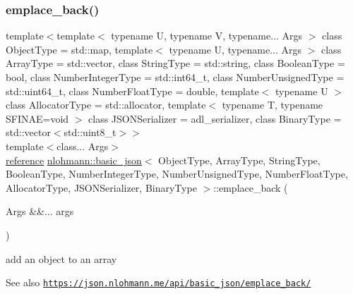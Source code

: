 \subsubsection{\texorpdfstring{emplace\+\_\+back()}{emplace\_back()}}
{\footnotesize\ttfamily template$<$template$<$ typename U, typename V, typename... Args $>$ class Object\+Type = std\+::map, template$<$ typename U, typename... Args $>$ class Array\+Type = std\+::vector, class String\+Type  = std\+::string, class Boolean\+Type  = bool, class Number\+Integer\+Type  = std\+::int64\+\_\+t, class Number\+Unsigned\+Type  = std\+::uint64\+\_\+t, class Number\+Float\+Type  = double, template$<$ typename U $>$ class Allocator\+Type = std\+::allocator, template$<$ typename T, typename S\+F\+I\+N\+A\+E=void $>$ class J\+S\+O\+N\+Serializer = adl\+\_\+serializer, class Binary\+Type  = std\+::vector$<$std\+::uint8\+\_\+t$>$$>$ \\
template$<$class... Args$>$ \\
\hyperlink{classnlohmann_1_1basic__json_a220ae98554a76205fb7f8822d36b2d5a}{reference} \hyperlink{classnlohmann_1_1basic__json}{nlohmann\+::basic\+\_\+json}$<$ Object\+Type, Array\+Type, String\+Type, Boolean\+Type, Number\+Integer\+Type, Number\+Unsigned\+Type, Number\+Float\+Type, Allocator\+Type, J\+S\+O\+N\+Serializer, Binary\+Type $>$\+::emplace\+\_\+back (\begin{DoxyParamCaption}\item[{Args \&\&...}]{args }\end{DoxyParamCaption})\hspace{0.3cm}{\ttfamily [inline]}}



add an object to an array 

\begin{DoxySeeAlso}{See also}
\href{https://json.nlohmann.me/api/basic_json/emplace_back/}{\tt https\+://json.\+nlohmann.\+me/api/basic\+\_\+json/emplace\+\_\+back/} 
\end{DoxySeeAlso}
\mbox{\label{classnlohmann_1_1basic__json_a5c99855f3e35ff35558cb46139b785f8}} 

